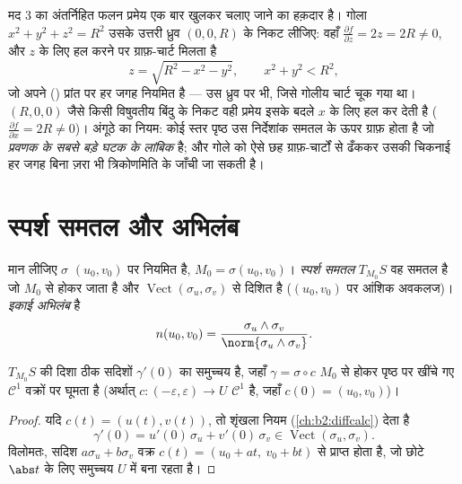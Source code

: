 \begin{example}[स्तर समुच्चय से ग्राफ़ तक]
\label{ex:b2:surfaces:levelgraph}
मद 3 का अंतर्निहित फलन प्रमेय एक बार खुलकर चलाए जाने का हक़दार है।
गोला $x^2 + y^2 + z^2 = R^2$ उसके उत्तरी ध्रुव $(0, 0, R)$ के निकट
लीजिए: वहाँ $\frac{\partial f}{\partial z} = 2z =
2R \neq 0$, और $z$ के लिए हल करने पर ग्राफ़-चार्ट मिलता है
\[
z = \sqrt{R^2 - x^2 - y^2},
\qquad x^2 + y^2 < R^2 ,
\]
जो अपने () प्रांत पर हर जगह नियमित है --- उस ध्रुव पर भी, जिसे
गोलीय चार्ट चूक गया था। $(R, 0, 0)$ जैसे किसी विषुवतीय बिंदु के
निकट वही प्रमेय इसके बदले $x$ के लिए हल कर देती है
($\frac{\partial f}{\partial x} = 2R \neq 0$)। अंगूठे का नियम: कोई स्तर पृष्ठ उस
निर्देशांक समतल के ऊपर ग्राफ़ होता है जो \emph{प्रवणक के सबसे बड़े
घटक के लांबिक} है; और गोले को ऐसे छह ग्राफ़-चार्टों से ढँककर उसकी
चिकनाई हर जगह बिना ज़रा भी त्रिकोणमिति के जाँची जा सकती है।
\end{example}

\section{स्पर्श समतल और अभिलंब}

\begin{definition}[स्पर्श समतल]\label{def:b2:surfaces:tangent}
मान लीजिए $\sigma$ $(u_0, v_0)$ पर नियमित है, $M_0 = \sigma(u_0, v_0)$।
\emph{स्पर्श समतल} $T_{M_0}S$ वह समतल है जो $M_0$ से होकर
जाता है और $\operatorname{Vect}(\sigma_u, \sigma_v)$ से दिशित है ($(u_0, v_0)$ पर आंशिक
अवकलज)। \emph{इकाई अभिलंब} है
\[
n(u_0, v_0)
= \frac{\sigma_u \wedge \sigma_v}
       {\norm{\sigma_u \wedge \sigma_v}} .
\]
\end{definition}

\begin{proposition}[स्पर्शी सदिश वेग सदिश ही
हैं]\label{prop:b2:surfaces:velocity}
$T_{M_0}S$ की दिशा ठीक सदिशों $\gamma'(0)$ का समुच्चय है, जहाँ
$\gamma = \sigma \circ c$ $M_0$ से होकर पृष्ठ पर खींचे गए $\mathcal{C}^1$ वक्रों पर
घूमता है (अर्थात् $c \colon (-\varepsilon, \varepsilon) \to U$ $\mathcal{C}^1$ है, जहाँ $c(0) = (u_0, v_0)$)।
\end{proposition}

\begin{proof}
यदि $c(t) = (u(t), v(t))$, तो शृंखला नियम
(\cref{ch:b2:diffcalc}) देता है
\[
\gamma'(0) = u'(0)\,\sigma_u + v'(0)\,\sigma_v
\in \operatorname{Vect}(\sigma_u, \sigma_v).
\]
विलोमतः, सदिश $a\sigma_u + b\sigma_v$ वक्र $c(t) = (u_0 + at,\ v_0 + bt)$ से प्राप्त होता है, जो
छोटे $\abs t$ के लिए  समुच्चय $U$ में बना रहता है।
\end{proof}


